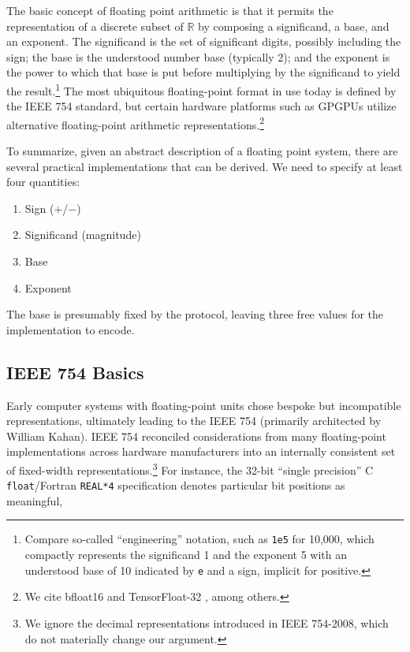 \documentclass[twoside]{article}
\begin{document}
The basic concept of floating point arithmetic is that it permits the representation of a discrete subset of $\mathbb{R}$ by composing a significand, a base, and an exponent.  The significand is the set of significant digits, possibly including the sign; the base is the understood number base (typically 2); and the exponent is the power to which that base is put before multiplying by the significand to yield the result.\footnote{Compare so-called “engineering” notation, such as \texttt{1e5} for 10,000, which compactly represents the significand 1 and the exponent 5 with an understood base of 10 indicated by \texttt{e} and a sign, implicit for positive.}  The most ubiquitous floating-point format in use today is defined by the IEEE 754 standard, but certain hardware platforms such as GPGPUs utilize alternative floating-point arithmetic representations.\footnote{We cite bfloat16 \citep{Wang2019} and TensorFloat-32 \citep{Kharva2020}, among others.}

To summarize, given an abstract description of a floating point system, there are several practical implementations that can be derived.  We need to specify at least four quantities:

\begin{enumerate}
  \item  Sign ($+$/$-$)
  \item  Significand (magnitude)
  \item  Base
  \item  Exponent
\end{enumerate}

The base is presumably fixed by the protocol, leaving three free values for the implementation to encode.


\subsection{IEEE 754 Basics}

Early computer systems with floating-point units chose bespoke but incompatible representations, ultimately leading to the IEEE 754 (primarily architected by William Kahan).  IEEE 754 reconciled considerations from many floating-point implementations across hardware manufacturers into an internally consistent set of fixed-width representations.\footnote{We ignore the decimal representations introduced in IEEE 754-2008, which do not materially change our argument.}  For instance, the 32-bit “single precision” C \texttt{float}/Fortran \texttt{REAL*4} specification denotes particular bit positions as meaningful,
\end{document}
